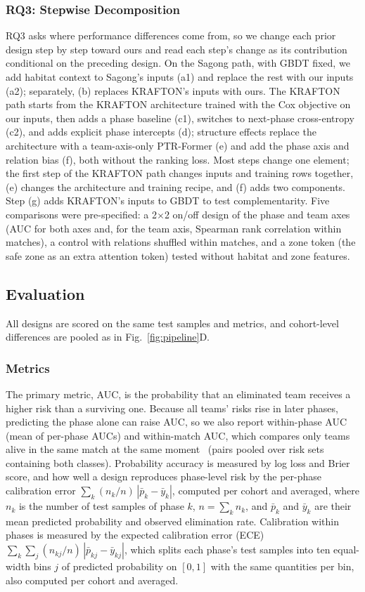\documentclass[conference]{IEEEtran}
\begin{document}
\subsubsection{RQ3: Stepwise Decomposition}
\label{sec:method:decomposition}
RQ3 asks where performance differences come from, so we change each prior design step by step toward ours and read each step's change as its contribution conditional on the preceding design.
On the Sagong path, with GBDT fixed, we add habitat context to Sagong's inputs (a1) and replace the rest with our inputs (a2); separately, (b) replaces KRAFTON's inputs with ours.
The KRAFTON path starts from the KRAFTON architecture trained with the Cox objective on our inputs, then adds a phase baseline (c1), switches to next-phase cross-entropy (c2), and adds explicit phase intercepts (d); structure effects replace the architecture with a team-axis-only PTR-Former (e) and add the phase axis and relation bias (f), both without the ranking loss.
Most steps change one element; the first step of the KRAFTON path changes inputs and training rows together, (e) changes the architecture and training recipe, and (f) adds two components.
Step (g) adds KRAFTON's inputs to GBDT to test complementarity.
Five comparisons were pre-specified: a 2$\times$2 on/off design of the phase and team axes (AUC for both axes and, for the team axis, Spearman rank correlation within matches), a control with relations shuffled within matches, and a zone token (the safe zone as an extra attention token) tested without habitat and zone features.

\subsection{Evaluation}
\label{sec:method:evaluation}
All designs are scored on the same test samples and metrics, and cohort-level differences are pooled as in Fig.~\ref{fig:pipeline}D.

\subsubsection{Metrics}
The primary metric, AUC, is the probability that an eliminated team receives a higher risk than a surviving one.
Because all teams' risks rise in later phases, predicting the phase alone can raise AUC, so we also report within-phase AUC (mean of per-phase AUCs) and within-match AUC, which compares only teams alive in the same match at the same moment~\cite{HeagertyZheng05} (pairs pooled over risk sets containing both classes).
Probability accuracy is measured by log loss and Brier score, and how well a design reproduces phase-level risk by the per-phase calibration error $\sum_{k}(n_k/n)\,|\bar{p}_k-\bar{y}_k|$, computed per cohort and averaged, where $n_k$ is the number of test samples of phase $k$, $n=\sum_k n_k$, and $\bar{p}_k$ and $\bar{y}_k$ are their mean predicted probability and observed elimination rate. Calibration within phases is measured by the expected calibration error (ECE)~\cite{Naeini15} $\sum_{k}\sum_{j}(n_{kj}/n)\,|\bar{p}_{kj}-\bar{y}_{kj}|$, which splits each phase's test samples into ten equal-width bins $j$ of predicted probability on $[0,1]$ with the same quantities per bin, also computed per cohort and averaged.
\end{document}
